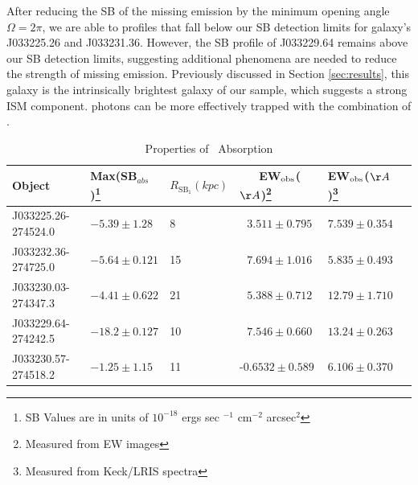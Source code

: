 \documentclass[twocolumn]{aastex61}
\begin{document}
After reducing the SB of the missing  emission by the minimum opening angle $\Omega=2\pi$, we are able to profiles that fall below our SB detection limits for galaxy's J033225.26 and J033231.36. However, the SB profile of J033229.64 remains above our SB detection limits, suggesting additional phenomena are needed to reduce the strength of missing emission. Previously discussed in Section \ref{sec:results}, this galaxy is the intrinsically brightest galaxy of our sample, which suggests a strong ISM component.  photons can be more effectively trapped with the combination of  \cite{Prochaska_2011}.


\begin{table}[]
\centering
\caption{Properties of \ Absorption\label{tab:abs_props}}  
\begin{tabular}{llllll} \hline \hline
Object & Max(SB$_{abs}$)\footnote{SB Values are in units of $10^{-18}$ ergs sec $^{-1}$ cm$^{-2}$ arcsec$^2$} & $R_{\text{SB}_1}(kpc)$ &\ \ \ EW$_{\rm{obs}}$($\AA$)\footnote{ Measured from EW images} & EW$_{\rm{obs}}$($\AA$)\footnote{Measured from Keck/LRIS spectra}  \\  \hline
J033225.26-274524.0 &  $-5.39 \pm 1.28 $ & 8 &     $\ \ \ 3.511 \pm 0.795$ & $7.539 \pm 0.354 $\\
J033232.36-274725.0 &  $-5.64 \pm 0.121 $ & 15 & $\ \ \ 7.694 \pm 1.016$ & $5.835 \pm 0.493$\\
J033230.03-274347.3 &  $-4.41 \pm 0.622 $ & 21 & $\ \ \ 5.388 \pm 0.712$ & $12.79 \pm 1.710$\\
J033229.64-274242.5 &  $-18.2 \pm 0.127 $ & 10 & $\ \ \ 7.546 \pm 0.660$ & $13.24 \pm 0.263$\\
J033230.57-274518.2 &  $-1.25 \pm 1.15   $ & 11& -$0.6532 \pm 0.589$ & $6.106 \pm 0.370$\\ \hline
\end{tabular}
\end{table}
\end{document}
